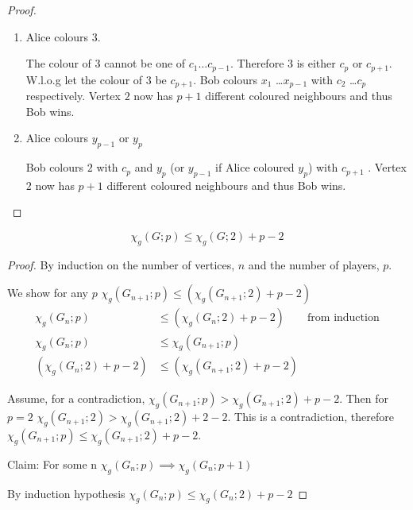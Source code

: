 \begin{proof}
\begin{enumerate}
        \item Alice colours $3$.
        
        The colour of $3$ cannot be one of $c_1 \ldots c_{p-1}$. Therefore $3$ is either $c_p$ or $c_{p+1}$. 
        W.l.o.g let the colour of $3$ be $c_{p+1}$.
        Bob colours $x_1$ \ldots $x_{p-1}$ with $c_2$ \ldots $c_{p}$ respectively.
        Vertex $2$ now has $p+1$ different coloured neighbours and thus Bob wins. 
        
        \item Alice colours $y_{p-1}$ or $y_{p}$
        
        Bob colours $2$ with $c_p$ and $y_{p}$ (or $y_{p-1}$ if Alice coloured $y_p$) with $c_{p+1}$ .
        Vertex $2$ now has $p+1$ different coloured neighbours and thus Bob wins. 
    \end{enumerate}

\end{proof}

\begin{theorem}    
    \[\chi_g(G;p) \leq \chi_g(G;2) + p -2 \]
\end{theorem}

\begin{proof}
    
    By induction on the number of vertices, $n$ and the number of players, $p$.
    
    We show for any $p$ $\chi_g(G_{n+1};p) \leq (\chi_g(G_{n+1};2) + p -2)$                   
    \begin{align}
    	\chi_g(G_n;p)          & \leq (\chi_g(G_n;2) + p -2)     & \text{from induction} \\
    	\chi_g(G_n;p)          & \leq \chi_g(G_{n+1};p)          &                       \\
    	(\chi_g(G_n;2) + p -2) & \leq (\chi_g(G_{n+1};2) + p -2) & 
    \end{align}
       
     Assume, for a contradiction, $\chi_g(G_{n+1};p) > \chi_g(G_{n+1};2) + p -2$. Then for $p=2$  $\chi_g(G_{n+1};2) > \chi_g(G_{n+1};2) + 2 -2$. This is a contradiction, therefore $\chi_g(G_{n+1};p) \leq \chi_g(G_{n+1};2) + p -2$.
       
    Claim: For some n $\chi_g(G_n;p) \implies \chi_g(G_n;p+1)$
    
    By induction hypothesis $\chi_g(G_n;p) \leq \chi_g(G_n;2) + p -2 $
    
\end{proof}



